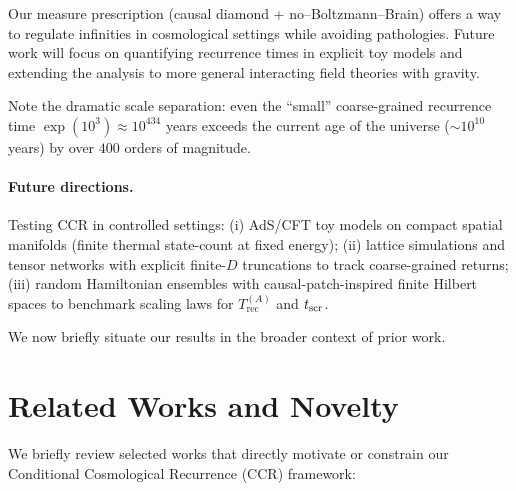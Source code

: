 \documentclass[12pt]{article}
\newcommand{\Trec}{T_{\text{rec}}}
\theoremstyle{remark}
\begin{document}
Our measure prescription (causal diamond + no--Boltzmann--Brain) offers a way to regulate infinities 
in cosmological settings while avoiding pathologies. 
Future work will focus on quantifying recurrence times in explicit toy models and extending the analysis 
to more general interacting field theories with gravity.

Note the dramatic scale separation: even the ``small'' coarse-grained recurrence time 
$\exp(10^{3}) \approx 10^{434}$ years exceeds the current age of the universe 
($\sim 10^{10}$ years) by over $400$ orders of magnitude.

\paragraph{Future directions.}
Testing CCR in controlled settings: (i) AdS/CFT toy models on compact spatial manifolds (finite thermal state-count at fixed energy); (ii) lattice simulations and tensor networks with explicit finite-$D$ truncations to track coarse-grained returns; (iii) random Hamiltonian ensembles with causal-patch-inspired finite Hilbert spaces to benchmark scaling laws for $\Trec^{(A)}$ and $t_{\rm scr}$.

We now briefly situate our results in the broader context of prior work.

\section{Related Works and Novelty}
We briefly review selected works that directly motivate or constrain our Conditional Cosmological Recurrence (CCR) framework:
\end{document}
